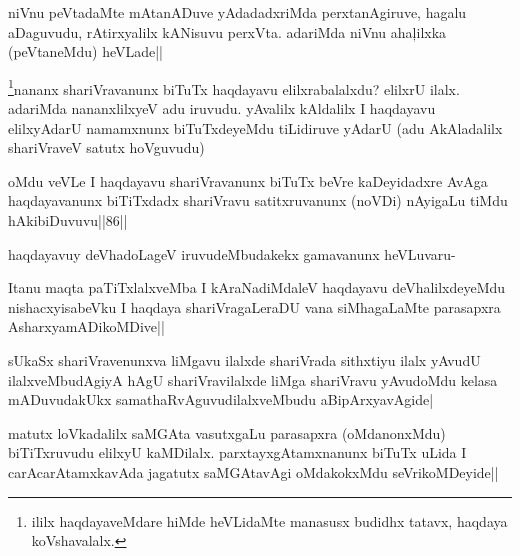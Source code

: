 \begin{artha}
niVnu peVtadaMte mAtanADuve yAdadadxriMda perxtanAgiruve, hagalu aDaguvudu, rAtirxyalilx kANisuvu perxVta. adariMda niVnu aha\c lilxka (peVtaneMdu) heVLade||
\end{artha}


\begin{artha}
\footnote[1]{ililx haqdayaveMdare hiMde heVLidaMte manasusx budidhx tatavx, haqdaya koVshavalalx.}nananx shariVravanunx biTuTx haqdayavu elilxrabalalxdu? elilxrU ilalx. adariMda nananxlilxyeV adu iruvudu. yAvalilx kAldalilx I haqdayavu elilxyAdarU namamxnunx biTuTxdeyeMdu tiLidiruve yAdarU (adu AkAladalilx shariVraveV satutx hoVguvudu)
\end{artha}


\begin{artha}
oMdu veVLe I haqdayavu shariVravanunx biTuTx beVre kaDeyidadxre AvAga haqdayavanunx biTiTxdadx shariVravu satitxruvanunx (noVDi) nAyigaLu tiMdu hAkibiDuvuvu||86||

haqdayavuy deVhadoLageV iruvudeMbudakekx gamavanunx heVLuvaru-
\end{artha}

\begin{artha}%
Itanu maqta paTiTxlalxveMba I kAraNadiMdaleV haqdayavu deVhalilxdeyeMdu nishacxyisabeVku I haqdaya shariVragaLeraDU vana siMhagaLaMte parasapxra AsharxyamADikoMDive||
\end{artha}


\begin{artha}
sUkaSx shariVravenunxva liMgavu ilalxde shariVrada sithxtiyu ilalx yAvudU ilalxveMbudAgiyA hAgU shariVravilalxde liMga shariVravu yAvudoMdu kelasa mADuvudakUkx samathaRvAguvudilalxveMbudu aBipArxyavAgide|
\end{artha}


\begin{artha}
matutx loVkadalilx saMGAta vasutxgaLu parasapxra (oMdanonxMdu) biTiTxruvudu elilxyU kaMDilalx. parxtayxgAtamxnanunx biTuTx uLida I carAcarAtamxkavAda jagatutx saMGAtavAgi oMdakokxMdu seVrikoMDeyide||
\end{artha}


